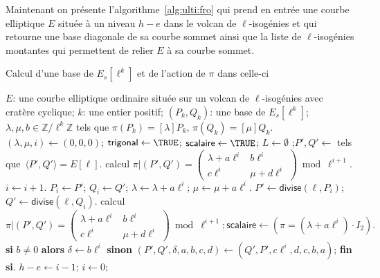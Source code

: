 \documentclass[10pt,a4paper]{book}
\theoremstyle{plain}
\theoremstyle{definition}
\theoremstyle{definition}
\theoremstyle{definition}
\theoremstyle{definition}
\theoremstyle{remark}
\theoremstyle{remark}
\theoremstyle{definition}
\begin{document}
Maintenant on présente l'algorithme~\ref{alg:ulti:fro} qui prend en entrée une 
courbe elliptique $E$ située à un niveau $h-e$ dans le volcan de 
$\ell$-isogénies et qui retourne une base diagonale de sa courbe sommet ainsi 
que la liste de $\ell$-isogénies montantes qui permettent de relier $E$ à sa 
courbe sommet.
\begin{algorithm}
\caption{\label{alg:ulti:fro}Calcul d'une base de $E_s[\ell^k]$ et de l'action de $\pi$ dans celle-ci}
\begin{algorithmic}[1]
\REQUIRE $E$: une courbe elliptique ordinaire située sur un volcan de $\ell$-isogénies avec cratère cyclique;
$k$: une entier positif;
\ENSURE $(P_k, Q_k )$: une base de $E_s[\ell^k]$;
$\lambda, \mu, b \in \mathbb{Z}/\ell^k \mathbb{Z}$
tels que $\pi(P_k)= [\lambda] P_k$, $ \pi(Q_k)= [\mu] Q_k$.
\STATE$(\lambda, \mu, i) \leftarrow (0,0,0)$; $\mathsf{trigonal} \leftarrow \TRUE $; $\mathsf{scalaire} \leftarrow \TRUE$; $L \leftarrow \emptyset $ ;$P', Q' \leftarrow $ tels que~$\langle P',Q' \rangle =  E[\ell]$. %
\STATE calcul $\pi|(P',Q')=\left( \begin{smallmatrix}
\lambda + a\ell^{i} & b\ell^{i}\\
c\ell^{i} & \mu + d\ell^{i} \end{smallmatrix} \right) \bmod {\ell^{i+1}}.$
 \label{alg:ult:scalaire:debut} %
\STATE $i \leftarrow i+1$. %
\STATE $P_i \leftarrow P'$; $Q_i \leftarrow Q'$; $\lambda \leftarrow \lambda+a \ell^i$; $\mu \leftarrow \mu +a \ell^i$.
\STATE\label{alg:ult:identical:divide}
  $P' \leftarrow \mathsf{divise}(\ell, P_{i})$; $Q' \leftarrow \mathsf{divise} (\ell, Q_{i})$.
\STATE calcul $\pi|(P',Q')=\left( \begin{smallmatrix}
\lambda + a\ell^{i} & b\ell^{i}\\
c\ell^{i} & \mu + d\ell^{i} \end{smallmatrix} \right) \bmod {\ell^{i+1}}; \mathsf{scalaire} \leftarrow (\pi=(\lambda + a\ell^{i}) \cdot I_2) .$
\ENDWHILE \label{alg:ult:scalaire:fin}
\STATE \textbf{si} $b \neq 0$ \textbf{alors} $\delta \leftarrow b \ell^i$ \textbf{sinon} $(P',Q',\delta,a,b,c,d) \leftarrow (Q',P', c \ell^i,d,c,b,a)$; \textbf{fin si}.
\STATE $h-e \leftarrow i-1$; $i \leftarrow 0$;
 \label{alg:ult:trigonal:debut} %

\end{algorithmic}
\end{algorithm}
\end{document}
